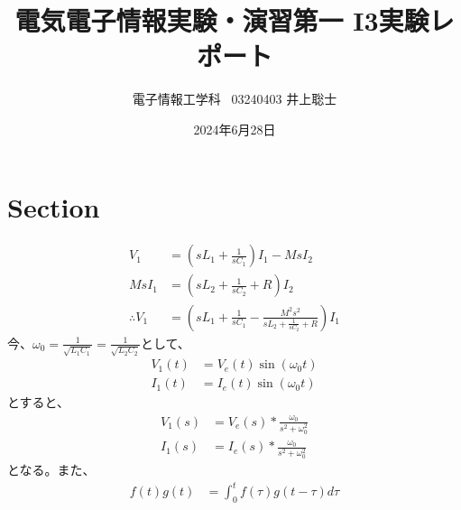 \documentclass[a4paper]{ltjsarticle}
\title{電気電子情報実験・演習第一 I3実験レポート}
\author{電子情報工学科 \ 03240403 井上聡士}
\date{2024年6月28日}
\begin{document}
\maketitle %
\section{Section}
\begin{align}
    V_1 &= \left( sL_1 + \frac{1}{sC_1} \right) I_1 - MsI_2 \\
    MsI_1 &= \left( sL_2 + \frac{1}{sC_2} + R \right) I_2 \\
    \therefore V_1 &= \left( sL_1 + \frac{1}{sC_1} - \frac{M^2s^2}{sL_2 + \frac{1}{sC_2} + R} \right) I_1
\end{align}
今、$\omega_0 = \frac{1}{\sqrt{L_1C_1}} = \frac{1}{\sqrt{L_2C_2}}$として、
\begin{align}
    V_1(t) &= V_e(t)\sin(\omega_0 t) \\
    I_1(t) &= I_e(t)\sin(\omega_0 t)
\end{align}
とすると、
\begin{align}
    V_1(s) &= V_e(s) * \frac{\omega_0}{s^2 + \omega_0^2} \\
    I_1(s) &= I_e(s) * \frac{\omega_0}{s^2 + \omega_0^2}
\end{align}
となる。また、
\begin{align}
    f(t)g(t) &= \int_{0}^{t}f(\tau)g(t-\tau)d\tau
\end{align}
\end{document}
